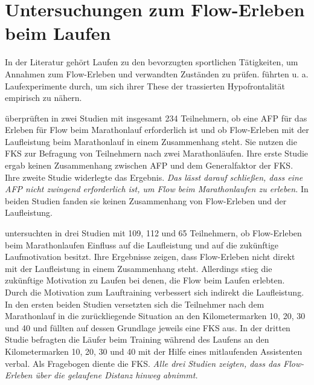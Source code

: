 

\section{Untersuchungen zum Flow-Erleben beim Laufen} 

\label{sec:untersuchungen_zum_flow_erleben_beim_laufen}

In der Literatur gehört Laufen zu den bevorzugten sportlichen Tätigkeiten, um Annahmen zum Flow-Erleben und verwandten Zuständen zu prüfen. \citet{Dietrich2004a} führten u. a. Laufexperimente durch, um sich ihrer These der trassierten Hypofrontalität empirisch zu nähern. 

\citet{Stoll2005} überprüften in zwei Studien mit insgesamt 234 Teilnehmern, ob eine \ac{AFP} für das Erleben für Flow beim Marathonlauf erforderlich ist und ob Flow-Erleben mit der Laufleistung beim Marathonlauf in einem Zusammenhang steht. Sie nutzen die \ac{FKS} zur Befragung von Teilnehmern nach zwei Marathonläufen. Ihre erste Studie ergab keinen Zusammenhang zwischen \ac{AFP} und dem Generalfaktor der \ac{FKS}. Ihre zweite Studie widerlegte das Ergebnis. \emph{Das lässt \citet{Stoll2005} darauf schließen, dass eine \ac{AFP} nicht zwingend erforderlich ist, um Flow beim Marathonlaufen zu erleben.} In beiden Studien fanden sie keinen Zusammenhang von Flow-Erleben und der Laufleistung. 

\citet{Schuler2009} untersuchten in drei Studien mit 109, 112 und 65 Teilnehmern, ob Flow-Erleben beim Marathonlaufen Einfluss auf die Laufleistung und auf die zukünftige Laufmotivation besitzt. Ihre Ergebnisse zeigen, dass Flow-Erleben nicht direkt mit der Laufleistung in einem Zusammenhang steht. Allerdings stieg die zukünftige Motivation zu Laufen bei denen, die Flow beim Laufen erlebten. Durch die Motivation zum Lauftraining verbessert sich indirekt die Laufleistung. In den ersten beiden Studien versetzten sich die Teilnehmer nach dem Marathonlauf in die zurückliegende Situation an den Kilometermarken 10, 20, 30 und 40 und füllten auf dessen Grundlage jeweils eine \ac{FKS} aus. In der dritten Studie befragten \citet{Schuler2009} die Läufer beim Training während des Laufens an den Kilometermarken 10, 20, 30 und 40 mit der Hilfe eines mitlaufenden Assistenten verbal. Als Fragebogen diente die \ac{FKS}. \emph{Alle drei Studien zeigten, dass das Flow-Erleben über die gelaufene Distanz hinweg abnimmt.} 

